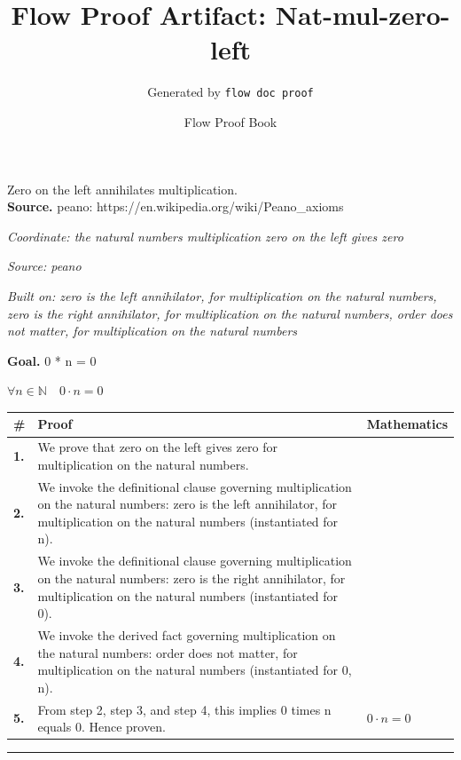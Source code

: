 \documentclass[11pt]{article}
\title{Flow Proof Artifact: Nat-mul-zero-left}
\author{Generated by \texttt{flow doc proof}}
\date{Flow Proof Book}
\theoremstyle{definition}
\begin{document}
\maketitle
Zero on the left annihilates multiplication.\\[0.5em]
\textbf{Source.} peano: https://en.wikipedia.org/wiki/Peano\_axioms\\[0.5em]
\bigskip
{}\par
\smallskip\noindent\textit{Coordinate: the natural numbers \cdot multiplication \cdot zero on the left gives zero}\par
\smallskip\noindent\textit{Source: peano}\par
\smallskip\noindent\textit{Built on: zero is the left annihilator, for multiplication on the natural numbers, zero is the right annihilator, for multiplication on the natural numbers, order does not matter, for multiplication on the natural numbers}\par
\medskip
\noindent\textbf{Goal.} 0 * n = 0\par
\noindent$\displaystyle \forall n \in \mathbb{N}\quad 0 \cdot n = 0$\par
\medskip
\noindent
\begin{tabular}{@{} >{\raggedright\arraybackslash}p{} >{\raggedright\arraybackslash}p{} >{\raggedleft\arraybackslash}p{} @{}}
\textbf{\#} & \textbf{Proof} & \textbf{Mathematics} \\
\midrule
\textbf{1.} & We prove that zero on the left gives zero for multiplication on the natural numbers. & \\[0.45em]
\textbf{2.} & We invoke the definitional clause governing multiplication on the natural numbers: zero is the left annihilator, for multiplication on the natural numbers (instantiated for n). & \\[0.45em]
\textbf{3.} & We invoke the definitional clause governing multiplication on the natural numbers: zero is the right annihilator, for multiplication on the natural numbers (instantiated for 0). & \\[0.45em]
\textbf{4.} & We invoke the derived fact governing multiplication on the natural numbers: order does not matter, for multiplication on the natural numbers (instantiated for 0, n). & \\[0.45em]
\textbf{5.} & From step 2, step 3, and step 4, this implies 0 times n equals 0. Hence proven. & $\displaystyle 0 \cdot n = 0$ \\[0.45em]
\bottomrule
\end{tabular}
\label{thm:Nat-multiplication-zero_on_the_left_gives_zero}
\par\medskip\hrule
\end{document}
